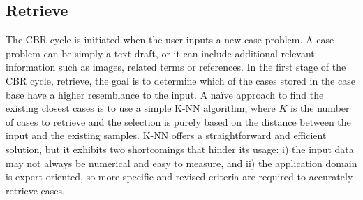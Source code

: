 \subsection{Retrieve}\label{5_sec:dl_powered_cbr_retrieve}
The CBR cycle is initiated when the user inputs a new case problem. A case problem can be simply a text draft, or it can include additional relevant information such as images, related terms or references. In the first stage of the CBR cycle, retrieve, the goal is to determine which of the cases stored in the case base have a higher resemblance to the input. A naïve approach to find the existing closest cases is to use a simple K-NN algorithm, where $K$ is the number of cases to retrieve and the selection is purely based on the distance between the input and the existing samples. K-NN offers a straightforward and efficient solution, but it exhibits two shortcomings that hinder its usage: i) the input data may not always be numerical and easy to measure, and ii) the application domain is expert-oriented, so more specific and revised criteria are required to accurately retrieve cases.

